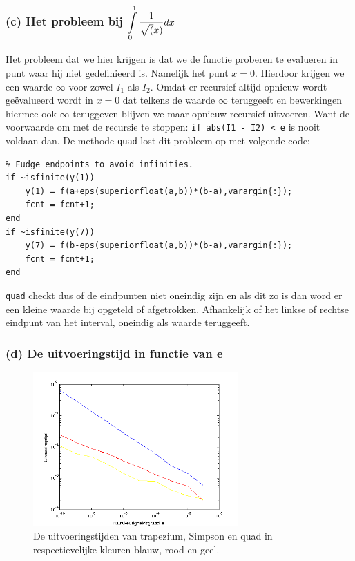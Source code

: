 \documentclass[11pt,a4paper]{article}
\begin{document}
\subsubsection*{(c) Het probleem bij $\mathop{\mathlarger{\int\limits_{0}^1\frac{1}{\sqrt(x)}dx}}$}
Het probleem dat we hier krijgen is dat we de functie proberen te evalueren in punt waar hij niet gedefinieerd is. Namelijk het punt $x=0$. Hierdoor krijgen we een waarde $\infty$ voor zowel $I_1$ als $I_2$. Omdat er recursief altijd opnieuw wordt ge\"evalueerd wordt in $x=0$ dat telkens de waarde $\infty$ teruggeeft en bewerkingen hiermee ook $\infty$ teruggeven blijven we maar opnieuw recursief uitvoeren. Want de voorwaarde om met de recursie te stoppen: 
\verb|if abs(I1 - I2) < e| is nooit voldaan dan.
De methode \verb|quad| lost dit probleem op met volgende code:
\vspace{-10pt}
\begin{verbatim}
% Fudge endpoints to avoid infinities.
if ~isfinite(y(1))
    y(1) = f(a+eps(superiorfloat(a,b))*(b-a),varargin{:});
    fcnt = fcnt+1;
end
if ~isfinite(y(7))
    y(7) = f(b-eps(superiorfloat(a,b))*(b-a),varargin{:});
    fcnt = fcnt+1;
end
\end{verbatim}
\verb|quad| checkt dus of de eindpunten niet oneindig zijn en als dit zo is dan word er een kleine waarde bij opgeteld of afgetrokken. Afhankelijk of het linkse of rechtse eindpunt van het interval, oneindig als waarde teruggeeft.
\subsubsection*{(d) De uitvoeringstijd in functie van e }

\begin{figure}[H]
	\vspace{-20pt}
	\centering
	\includegraphics[width=0.7\textwidth]{12d1.png}
	\caption*{De uitvoeringstijden van trapezium, Simpson en quad in respectievelijke kleuren blauw, rood en geel.}
	\end{figure}
\end{document}
